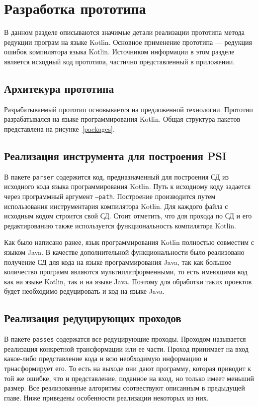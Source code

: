 \chapter{Разработка прототипа}
В данном разделе описываются значимые детали реализации прототипа метода редукции програм на языке Kotlin. Основное применение прототипа --- редукция ошибок компилятора языка Kotlin. Источником информации в этом разделе является исходный код прототипа, частично представленный в приложении.
\section{Архитекура прототипа}
Разрабатываемый прототип основывается на предложенной технологии. Прототип разрабатывался на языке программирования Kotlin. Общая структура пакетов представлена на рисунке~\ref{packages}.

\section{Реализация инструмента для построения PSI}
В пакете \texttt{parser} содержится код, предназначенный для построения СД из исходного кода языка программирования Kotlin. Путь к исходному коду задается через программный аргумент \texttt{--path}. Построение производится путем использования инструментария компилятора Kotlin. Для каждого файла с исходным кодом строится свой СД. Стоит отметить, что для прохода по СД и его редактированию также используется функциональность компилятора Kotlin.

Как было написано ранее, язык программирования Kotlin полностью совместим с языком Java. В качестве дополнительной функциональности было реализовано получение СД для кода на языке программирования Java, так как большое количество программ являются мультиплатформенными, то есть имеющими код как на языке Kotlin, так и на языке Java. Поэтому для обработки таких проектов будет необходимо редуцировать и код на языке Java. 

\section{Реализация редуцирующих проходов}
В пакете \texttt{passes} содержатся все редуцирующие проходы. Проходом называется реализация конкретной трансформации или ее части. Проход принимает на вход какое-либо представление кода и всю необходимую информацию и трнасформирует его. То есть на выходе они дают программу, которая приводит к той же ошибке, что и представление, поданное на вход, но только имеет меньший размер. Все реализованные алгоритмы соотвествуют описанным в предыдущей главе. Ниже приведены особенности реализации некоторых из них.

